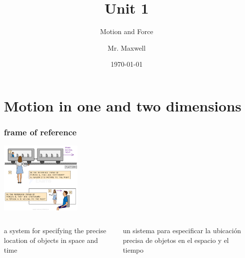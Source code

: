 \documentclass{beamer}
\title{Unit 1}
\subtitle{Motion and Force}
\author{Mr. Maxwell}
\institute{PACS}
\date{\today}
\begin{document}
\frame{\titlepage}

\section{Motion in one and two dimensions}

\begin{frame}
    \frametitle{frame of reference}
    \includegraphics[width=4cm]{../../images/frame_of_reference.png}
    \begin{columns}
        \begin{column}{5cm}
            \onslide a system for specifying the precise location of objects in space and time\\
        \end{column}
        \begin{column}{5cm}
        \pause un sistema para especificar la ubicación precisa de objetos en el espacio y el tiempo
    \end{column}
    \end{columns}


\end{frame}
\end{document}
